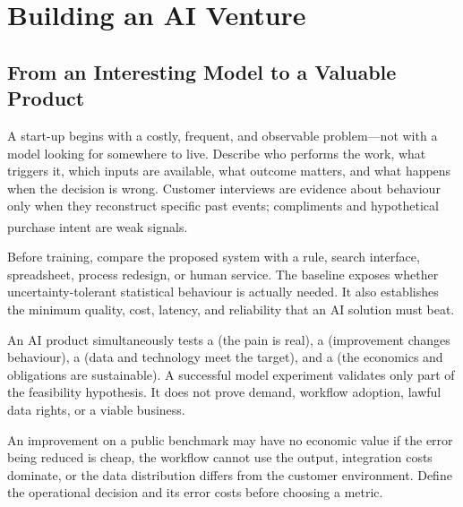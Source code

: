 \chapter{Building an AI Venture}
\label{ch:startup}

\section{From an Interesting Model to a Valuable Product}

\begin{tcbitemize}[skin=sectionraster]
\tcbitem[title={Start with a Painful Workflow},raster multicolumn=3]
A start-up begins with a costly, frequent, and observable problem---not with a
model looking for somewhere to live.
Describe who performs the work, what triggers it, which inputs are available,
what outcome matters, and what happens when the decision is wrong.
Customer interviews are evidence about behaviour only when they reconstruct
specific past events; compliments and hypothetical purchase intent are weak
signals\textsuperscript{\cite{constableTalkingHumansSuccess2014}}.

\tcbitem[title={Write the Non-AI Baseline First},raster multicolumn=3]
Before training, compare the proposed system with a rule, search interface,
spreadsheet, process redesign, or human service.
The baseline exposes whether uncertainty-tolerant statistical behaviour is
actually needed.
It also establishes the minimum quality, cost, latency, and reliability that
an AI solution must beat.

\tcbitem[title={Separate Four Hypotheses},raster multicolumn=6]
An AI product simultaneously tests a  (the pain is
real), a  (improvement changes behaviour), a
 (data and technology meet the target), and a
 (the economics and obligations are sustainable).
A successful model experiment validates only part of the feasibility
hypothesis.
It does not prove demand, workflow adoption, lawful data rights, or a viable
business.
\end{tcbitemize}

\begin{cautionbox}
An improvement on a public benchmark may have no economic value if the error
being reduced is cheap, the workflow cannot use the output, integration costs
dominate, or the data distribution differs from the customer environment.
Define the operational decision and its error costs before choosing a metric.
\end{cautionbox}

